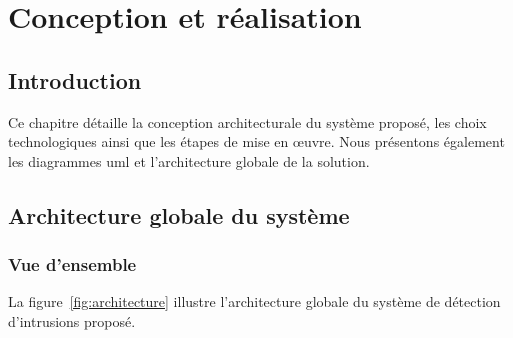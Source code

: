 \chapter{Conception et réalisation}
\label{chap:conception}

\section*{Introduction}

Ce chapitre détaille la conception architecturale du système proposé, les choix technologiques ainsi que les étapes de mise en œuvre. Nous présentons également les diagrammes \gls{uml} et l'architecture globale de la solution.

\section{Architecture globale du système}
\label{sec:architecture}

\subsection{Vue d'ensemble}

La figure~\ref{fig:architecture} illustre l'architecture globale du système de détection d'intrusions proposé.

